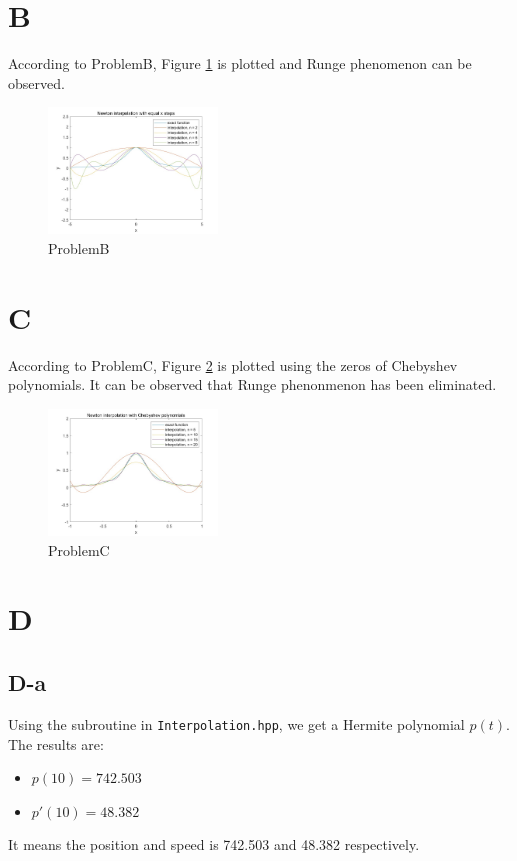 \documentclass[a4paper]{article}
\begin{document}
\section*{B}
According to ProblemB, Figure \ref{fig:ProblemB} is plotted and Runge phenomenon can be observed.
\begin{figure}[h]
  \centering
  \includegraphics[width=0.4\textwidth]{fig/ProblemB.jpg}
  \caption{ProblemB}
  \label{fig:ProblemB}
\end{figure}

\section*{C}
According to ProblemC, Figure \ref{fig:ProblemC} is plotted using the zeros of Chebyshev polynomials.
It can be observed that Runge phenonmenon has been eliminated.
\begin{figure}[htbp]
  \centering
  \includegraphics[width=0.4\textwidth]{fig/ProblemC.jpg}
  \caption{ProblemC}
  \label{fig:ProblemC}
\end{figure}

\section*{D}
\subsection*{D-a}
Using the subroutine in \verb|Interpolation.hpp|, we get a Hermite polynomial $p(t)$. The results are:
\begin{itemize}
  \item $p(10) = 742.503$
  \item $p'(10) = 48.382$
\end{itemize}
It means the position and speed is 742.503 and 48.382 respectively.
\end{document}
